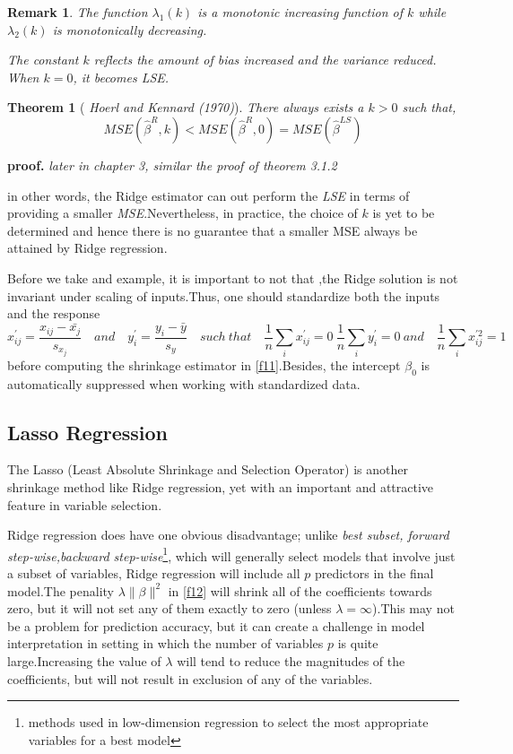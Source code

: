 \documentclass[12pt]{report}
\renewcommand{\emph}{\textit}
\newtheorem{theoreme}{Theorem}[section] %
\newtheorem{remarque}{Remark}[section]
\begin{document}
	\begin{remarque}
		The function $\lambda_{1}(k)$ is a monotonic increasing function of $k$ while $\lambda_{2}(k)$ is monotonically decreasing. 
		
		The constant $k$ reflects the amount of bias increased and the variance reduced. When $k=0$, it becomes LSE.
	\end{remarque}
	\begin{theoreme}[ \emph{Hoerl and Kennard (1970)}]
		There always exists a $k > 0$ such that, 
		$$MSE(\hat{\beta}^{R},k)<MSE(\hat{\beta}^{R},0)=MSE(\hat{\beta}^{LS})$$
	\end{theoreme}
	\textbf{proof.} \textit{later in chapter 3, similar the proof of theorem 3.1.2}
	
	in other words, the Ridge estimator can out perform the \emph{LSE } in terms of providing a smaller \emph{MSE}.Nevertheless, in practice, the choice of $k$ is yet to be determined and hence there is no guarantee that a smaller MSE always be attained by Ridge regression.
	
	Before we take and example, it is important to not that ,the Ridge solution is not invariant under scaling of inputs.Thus, one should standardize both the inputs and the response 
	$$ x_{ij}^{'}=\frac{x_{ij}-\bar{x_{j}}}{s_{x_{j}}}\quad and\quad  y_{i}^{'}=\frac{y_{i}-\bar{y}}{s_{y}}\quad such\ that\quad \frac{1}{n} \sum_{i} x_{ij}^{'}=0\    \frac{1}{n} \sum_{i} y_{i}^{'}=0\ and\quad \frac{1}{n} \sum_{i} x_{ij}^{'2}=1$$
	before computing the shrinkage estimator in \eqref{f11}.Besides, the intercept $\beta_{0}$ is automatically suppressed  when working with standardized data.
	\subsection{Lasso Regression}
	The Lasso (Least Absolute Shrinkage and Selection Operator) is another shrinkage method like Ridge regression, yet with an important and attractive feature in variable selection.
	
	Ridge regression does have one obvious disadvantage; unlike \emph{best subset, forward step-wise,backward step-wise}\footnote{methods used in low-dimension regression to select the most appropriate variables for a best model}, which will generally select models that involve just a subset of variables, Ridge regression will include all $p$ predictors in the final model.The penality $\lambda\parallel \beta \parallel^{2}$  in \eqref{f12} will shrink all of the coefficients towards zero, but it will not set any of them exactly to zero (unless $\lambda=\infty$).This may not be a problem for prediction accuracy, but it can create a challenge in model interpretation in setting in which the number of variables $p$ is quite large.Increasing the value of $\lambda$ will tend to reduce the magnitudes of the coefficients, but will not result in exclusion of any of the variables.
	
\end{document}
